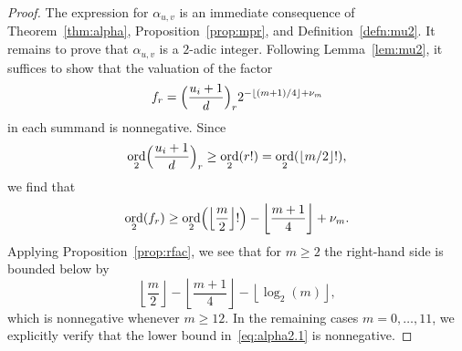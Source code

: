 \documentclass[a4paper,11pt]{article}
\numberwithin{equation}{section}
\providecommand{\floor}[1]{\left\lfloor#1\right\rfloor}   %
\DeclareMathOperator{\ord}{ord}          %
\theoremstyle{definition}
\newtheorem{rem}[thm]{Remark}
\begin{document}
\begin{proof}
The expression for $\alpha_{u,v}$ is an immediate consequence 
of Theorem~\ref{thm:alpha}, Proposition~\ref{prop:mpr}, and 
Definition~\ref{defn:mu2}. It remains to prove that 
$\alpha_{u,v}$ is a $2$-adic integer.  Following Lemma~\ref{lem:mu2}, 
it suffices to show that the valuation of the factor 
\begin{equation} \label{eq:fr}
f_r=\Bigl(\frac{u_i+1}{d}\Bigr)_r 2^{- \floor{(m+1)/4} + \nu_m}
\end{equation}
in each summand is nonnegative. Since
\[
\ord_{2} \Bigl(\frac{u_i+1}{d}\Bigr)_r \geq \ord_{2}(r!) = \ord_{2}(\floor{m/2}!),
\] 
we find that 
\begin{equation} \label{eq:alpha2.1}
\ord_{2}(f_r)
\geq \ord_{2} \Bigl(\floor{\frac{m}{2}}!\Bigr) - \floor{\frac{m+1}{4}} + \nu_m.
\end{equation}
Applying Proposition~\ref{prop:rfac}, we see that for $m \geq 2$ the right-hand side 
is bounded below by 
\begin{equation*}
\floor{\frac{m}{2}} - \floor{\frac{m+1}{4}} - \floor{\log_2(m)},
\end{equation*}
which is nonnegative whenever $m \geq 12$.  In the remaining 
cases $m = 0, \dotsc, 11$, we explicitly verify that the 
lower bound in~\eqref{eq:alpha2.1} is nonnegative.
\end{proof}

\begin{comment}
\begin{rem}
We observe that in Theorem~\ref{thm:alpha2} the exponent 
$-\floor{(m+1)/4}+\nu_m$ is nonpositive for each value $m \geq 0$, 
so at first sight it seems that the computation of the $f_r$ from
\eqref{eq:fr} will suffer from precision loss. 
However, we recall that $m = m(0) + 2r$, $m(0) \in \{0,1\}$, and noting that 
$d$ is odd let $g_r = d^r f_r$ and $z = u_i + 1$ to temporarily simplify 
our notation.  We now see that the sequence satisfies 
\begin{align*}
g_0 & = 1, \\
g_1 & = z, \\
g_5 & = 2^{-2-m(0)} \bigl( z (z + d) (z + 2d) (z + 3d) (z + 4d) \bigr) \\
g_r & = g_{r-2} \frac{(z + (r - 2)d)(z + (r - 1)d)}{2}
\end{align*}
for all remaining $r \geq 0$.  Since the numerator is an even integer, 
it follows that this computation can be carried out without precision loss.
\end{rem}
\end{comment}
\end{document}
